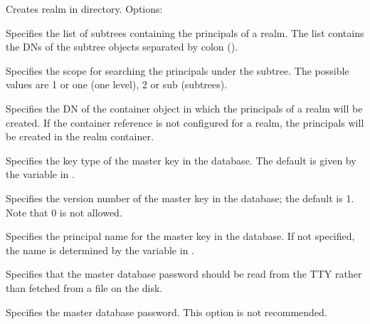 \documentclass[letterpaper,10pt,english]{sphinxmanual}
\begin{document}
\sphinxAtStartPar
Creates realm in directory. Options:
\begin{description}
\sphinxAtStartPar
Specifies the list of subtrees containing the principals of a
realm.  The list contains the DNs of the subtree objects separated
by colon (\sphinxcode{\sphinxupquote{:}}).

\sphinxAtStartPar
Specifies the scope for searching the principals under the
subtree.  The possible values are 1 or one (one level), 2 or sub
(subtrees).

\sphinxAtStartPar
Specifies the DN of the container object in which the principals
of a realm will be created.  If the container reference is not
configured for a realm, the principals will be created in the
realm container.

\sphinxAtStartPar
Specifies the key type of the master key in the database.  The
default is given by the  variable in
{\hyperref[\detokenize{admin/conf_files/kdc_conf:kdc-conf-5}]{}}.

\sphinxAtStartPar
Specifies the version number of the master key in the database;
the default is 1.  Note that 0 is not allowed.

\sphinxAtStartPar
Specifies the principal name for the master key in the database.
If not specified, the name is determined by the
 variable in {\hyperref[\detokenize{admin/conf_files/kdc_conf:kdc-conf-5}]{}}.

\sphinxAtStartPar
Specifies that the master database password should be read from
the TTY rather than fetched from a file on the disk.

\sphinxAtStartPar
Specifies the master database password. This option is not
recommended.


\end{description}
\end{document}
